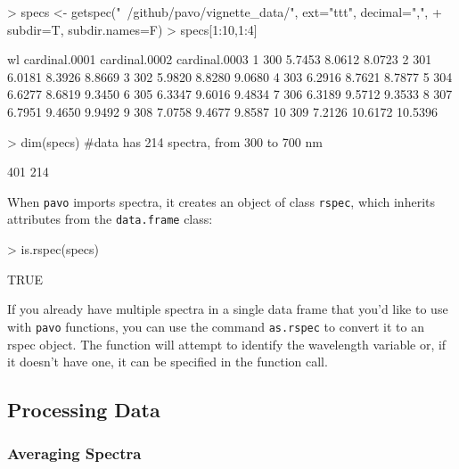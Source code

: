 \documentclass{article}
\newcommand{\pavo}{{\tt pavo}}  %
\newcommand{\code}[1]{{\tt #1}}  %
\begin{document}
\begin{Schunk}
\begin{Sinput}
> specs <- getspec("~/github/pavo/vignette_data/", ext="ttt", decimal=",", 
+                  subdir=T, subdir.names=F)
> specs[1:10,1:4]
\end{Sinput}
\begin{Soutput}
    wl cardinal.0001 cardinal.0002 cardinal.0003
1  300        5.7453        8.0612        8.0723
2  301        6.0181        8.3926        8.8669
3  302        5.9820        8.8280        9.0680
4  303        6.2916        8.7621        8.7877
5  304        6.6277        8.6819        9.3450
6  305        6.3347        9.6016        9.4834
7  306        6.3189        9.5712        9.3533
8  307        6.7951        9.4650        9.9492
9  308        7.0758        9.4677        9.8587
10 309        7.2126       10.6172       10.5396
\end{Soutput}
\begin{Sinput}
> dim(specs) #data has 214 spectra, from 300 to 700 nm
\end{Sinput}
\begin{Soutput}
[1] 401 214
\end{Soutput}
\end{Schunk}

When \pavo{} imports spectra, it creates an object of class \code{rspec}, which inherits 
attributes from the \code{data.frame} class:
\begin{Schunk}
\begin{Sinput}
> is.rspec(specs)
\end{Sinput}
\begin{Soutput}
[1] TRUE
\end{Soutput}
\end{Schunk}

If you already have multiple spectra in a single data frame that you'd like to use with \pavo{} 
functions, you can use the command \code{as.rspec} to convert it to an rspec object. The 
function will attempt to identify the wavelength variable or, if it doesn't have one, it can be 
specified in the function call.

\subsection{Processing Data}

\subsubsection{Averaging Spectra}
\end{document}
